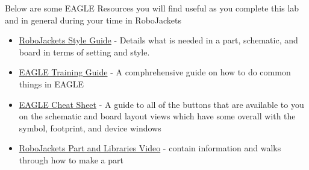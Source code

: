 \documentclass{article}
\begin{document}
Below are some EAGLE Resources you will find useful as you complete this lab and in general during your time in RoboJackets
\begin{itemize}
    \item \href{https://wiki.robojackets.org/EAGLE_Style_Guide}{RoboJackets Style Guide} - Details what is needed in a part, schematic, and board in terms of setting and style.
    \item \href{https://github.com/RoboJackets/electrical-training/blob/master/references/eagle_training_guide/eagle_guide.pdf}{EAGLE Training Guide} - A comphrehensive guide on how to do common things in EAGLE
    \item \href{https://github.com/RoboJackets/electrical-training/blob/master/references/eagle_cheat_sheet/eagle_cheat_sheet.pdf}{EAGLE Cheat Sheet} - A guide to all of the buttons that are available to you on the schematic and board layout views which have some overall with the symbol, footprint, and device windows
    \item \href{https://www.youtube.com/watch?v=ayiXpakBtsM&list=PL1R5gSylLha2iQ7e9mwiXJDY2RXoM8HxK&index=2}{RoboJackets Part and Libraries Video} - contain information and walks through how to make a part
\end{itemize}
\end{document}
